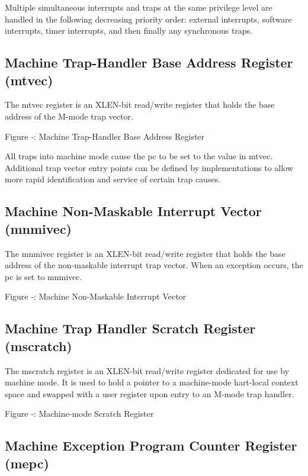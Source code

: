 Multiple simultaneous interrupts and traps at the same privilege level
are handled in the following decreasing priority order: external
interrupts, software interrupts, timer interrupts, and then finally any
synchronous traps.

\subsection{Machine Trap-Handler Base Address Register
(mtvec)}\label{machine-trap-handler-base-address-register-mtvec}

The mtvec register is an XLEN-bit read/write register that holds the
base address of the M-mode trap vector.

\missingfigure{}

Figure ‑: Machine Trap-Handler Base Address Register

All traps into machine mode cause the pc to be set to the value in
mtvec. Additional trap vector entry points can be defined by
implementations to allow more rapid identification and service of
certain trap causes.

\subsection{Machine Non-Maskable Interrupt Vector
(mnmivec)}\label{machine-non-maskable-interrupt-vector-mnmivec}

The mnmivec register is an XLEN-bit read/write register that holds the
base address of the non-maskable interrupt trap vector. When an
exception occurs, the pc is set to mnmivec.

\missingfigure{}

Figure ‑: Machine Non-Maskable Interrupt Vector

\subsection{Machine Trap Handler Scratch Register
(mscratch)}\label{machine-trap-handler-scratch-register-mscratch}

The mscratch register is an XLEN-bit read/write register dedicated for
use by machine mode. It is used to hold a pointer to a machine-mode
hart-local context space and swapped with a user register upon entry to
an M-mode trap handler.

\missingfigure{}

Figure ‑: Machine-mode Scratch Register

\subsection{Machine Exception Program Counter Register
(mepc)}\label{machine-exception-program-counter-register-mepc}

